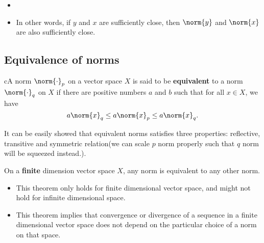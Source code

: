 \begin{refsection}
\begin{remark}[intuition]\hfill
\begin{itemize}
	\item 
	\item In other words, if $y$ and $x$ are sufficiently close, then $\norm{y}$ and $\norm{x}$ are also sufficiently close.
\end{itemize}	
	
\end{remark}


\subsection{Equivalence of norms}
\begin{definition}\cite[75]{kreyszig1989introductory}
	cA norm $\norm{\cdot}_p$ on a vector space $X$ is said to be \textbf{equivalent} to a norm $\norm{\cdot}_q$ on $X$ if there are positive numbers $a$ and $b$ such that for all $x\in X$, we have
	$$a\norm{x}_q \leq a\norm{x}_p \leq a\norm{x}_q.$$
\end{definition}

\begin{remark}
	It can be easily showed that equivalent norms satisfies three properties: reflective, transitive and symmetric relation(we can scale $p$ norm properly such that $q$ norm will be squeezed instead.).
\end{remark}


\begin{theorem}\cite[75]{kreyszig1989introductory}
On a \textbf{finite} dimension vector space $X$, any norm is equivalent to any other norm. 	
\end{theorem}

\begin{remark}[interpretations]\hfill
\begin{itemize}
	\item This theorem only holds for finite dimensional vector space, and might not hold for infinite dimensional space.
	\item This theorem implies that convergence or divergence of a sequence in a finite dimensional vector space does not depend on the particular choice of a norm on that space. 
\end{itemize}
\end{remark}




\end{refsection}
